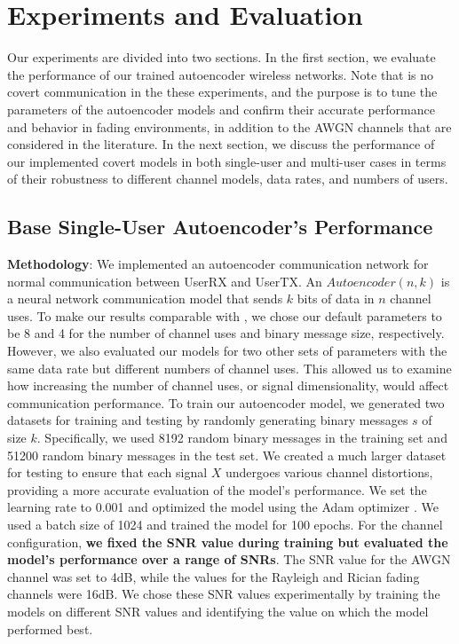 \section{Experiments and Evaluation}
\label{s:eval}
Our experiments are divided into two sections. In the first section, we evaluate the performance of our trained autoencoder wireless networks. Note that is no covert communication in the these experiments, and the purpose is to tune the parameters of the autoencoder models and confirm their accurate performance and behavior in fading environments, in addition to the AWGN channels that are considered in the literature. In the next section, we discuss the performance of our implemented covert models in both single-user and multi-user cases in terms of their robustness to different channel models, data rates, and numbers of users.

\subsection{Base Single-User Autoencoder's Performance}
\textbf{Methodology}: We implemented an autoencoder communication network for normal communication between UserRX and UserTX. An \(Autoencoder (n, k)\) is a neural network communication model that sends \(k\) bits of data in \(n\) channel uses. To make our results comparable with \cite{o2017introduction}, we chose our default parameters to be 8 and 4 for the number of channel uses and binary message size, respectively. However, we also evaluated our models for two other sets of parameters with the same data rate but different numbers of channel uses. This allowed us to examine how increasing the number of channel uses, or signal dimensionality, would affect communication performance. To train our autoencoder model, we generated two datasets for training and testing by randomly generating binary messages \(s\) of size \(k\). Specifically, we used 8192 random binary messages in the training set and 51200 random binary messages in the test set. We created a much larger dataset for testing to ensure that each signal \(X\) undergoes various channel distortions, providing a more accurate evaluation of the model's performance. We set the learning rate to 0.001 and optimized the model using the Adam optimizer \cite{kingma2014adam}. We used a batch size of 1024 and trained the model for 100 epochs. For the channel configuration, \textbf{we fixed the SNR value during training but evaluated the model's performance over a range of SNRs}. The SNR value for the AWGN channel was set to 4dB, while the values for the Rayleigh and Rician fading channels were 16dB. We chose these SNR values experimentally by training the models on different SNR values and identifying the value on which the model performed best.

